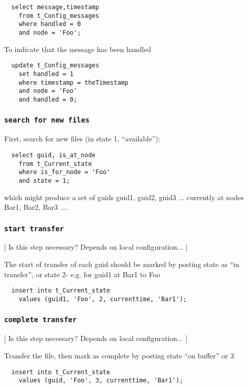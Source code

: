 \documentclass{cmspaper}
\begin{document}
{\small\begin{verbatim}
  select message,timestamp
  	from t_Config_messages
  	where handled = 0
  	and node = 'Foo';
\end{verbatim}}

To indicate that the message has been handled

{\small\begin{verbatim}
  update t_Config_messages
  	set handled = 1
  	where timestamp = theTimestamp
  	and node = 'Foo'
  	and handled = 0;
\end{verbatim}}

\subsubsection{\textbf{\texttt{search for new files}}}
First, search for new files (in state 1, ``available''):

{\small\begin{verbatim}
  select guid, is_at_node
    from t_Current_state
    where is_for_node = 'Foo'
    and state = 1;
\end{verbatim}}

which might produce a set of guids {guid1, guid2, guid3 ...} currently at nodes {Bar1, Bar2, Bar3 ...}. 

\subsubsection{\textbf{\texttt{start transfer}}}
[ Is this step necessary? Depends on local configuration... ]

The start of transfer of each guid should be marked by posting state as ``in transfer'', or state 2- e.g. for guid1 at Bar1 to Foo

{\small\begin{verbatim}
  insert into t_Current_state
    values (guid1, 'Foo', 2, currenttime, 'Bar1');
\end{verbatim}}

\subsubsection{\textbf{\texttt{complete transfer}}}
[ Is this step necessary? Depends on local configuration... ]

Transfer the file, then mark as complete by posting state ``on buffer'' or 3

{\small\begin{verbatim}
  insert into t_Current_state
    values (guid, 'Foo', 3, currenttime, 'Bar1');
\end{verbatim}}
\end{document}
